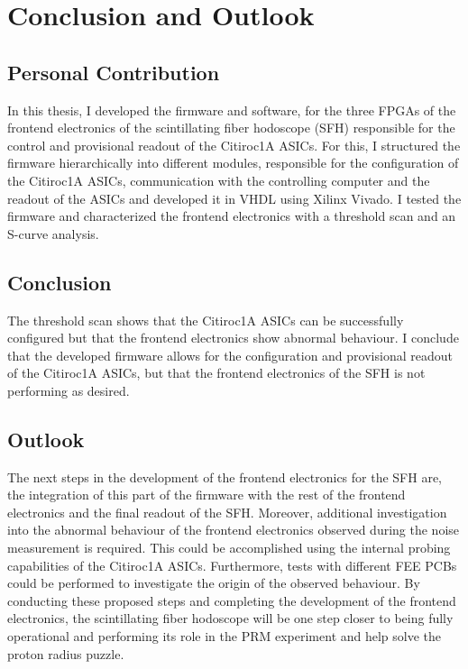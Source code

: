 \chapter{Conclusion and Outlook}
\noindent
\section{Personal Contribution}
In this thesis, I developed the firmware and software, 
for the three FPGAs of the frontend electronics of the scintillating fiber hodoscope (SFH) responsible for the control and provisional readout of the Citiroc1A ASICs.
\newline
For this, I structured the firmware hierarchically into different modules, responsible for the configuration of the Citiroc1A ASICs, communication with the controlling computer and the readout of the ASICs and developed it in VHDL using Xilinx Vivado.
\newline
I tested the firmware and characterized the frontend electronics with a threshold scan and an S-curve analysis.
\section{Conclusion}
The threshold scan shows that the Citiroc1A ASICs can be successfully configured but that the frontend electronics show abnormal behaviour.
I conclude that the developed firmware allows for the configuration and provisional readout of the Citiroc1A ASICs, 
but that the frontend electronics of the SFH is not performing as desired.

\section{Outlook}
The next steps in the development of the frontend electronics for the SFH are,
the integration of this part of the firmware with the rest of the frontend electronics and the final readout of the SFH.
Moreover, additional investigation into the abnormal behaviour of the frontend electronics observed during the noise measurement is required.
\newline
This could be accomplished using the internal probing capabilities of the Citiroc1A ASICs.
Furthermore, tests with different FEE PCBs could be performed to investigate the origin of the observed behaviour.
\newline
By conducting these proposed steps and completing the development of the frontend electronics,
the scintillating fiber hodoscope will be one step closer to being fully operational and performing its role in the PRM experiment and help solve the proton radius puzzle.
